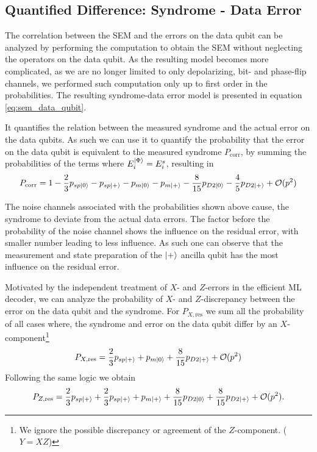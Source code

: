 \subsection{Quantified Difference: Syndrome - Data Error}\label{ssec:sem_difference_data_qubits}

The correlation between the SEM and the errors on the data qubit can be analyzed by performing the computation to obtain the SEM without neglecting the operators on the data qubit. 
As the resulting model becomes more complicated, as we are no longer limited to only depolarizing, bit- and phase-flip channels, we performed such computation only up to first order in the probabilities.
The resulting syndrome-data error model is presented in equation \eqref{eq:sem_data_qubit}.

It quantifies the relation between the measured syndrome and the actual error on the data qubits. 
As such we can use it to quantify the probability that the error on the data qubit is equivalent to the measured syndrome $P_{\mathrm{corr}}$, 
by summing the probabilities of the terms where $E_i^{\ket{\Phi}} = E_i^s$, resulting in 
\begin{equation}
    P_{\mathrm{corr}} = 
    1
    -\frac{2}{3}p_{sp\ket{0}}
    -p_{sp\ket{+}}
    -p_{m\ket{0}}
    -p_{m\ket{+}}
    -\frac{8}{15}p_{D2\ket{0}}
    -\frac{4}{5}p_{D2\ket{+}}  
    + \mathcal{O}(p^2)
\end{equation}

The noise channels associated with the probabilities shown above cause, the syndrome to deviate from the actual data errors.
The factor before the probability of the noise channel shows the influence on the residual error, with smaller number leading to less influence. 
As such one can observe that the measurement and state preparation of the $\ket{+}$ ancilla qubit has the most influence on the residual error. 

Motivated by the independent treatment of $X$- and $Z$-errors in the efficient ML decoder, 
we can analyze the probability of $X$- and $Z$-discrepancy between the error on the data qubit and the syndrome. 
For $P_{X,\mathrm{res}}$ we sum all the probability of all cases where, the syndrome and error on the data qubit differ by an $X$-component\footnote{
    We ignore the possible discrepancy or agreement of the $Z$-component. ($Y=XZ$)
    } 
\begin{equation}
    P_{X,\mathrm{res}} = 
    \frac{2}{3}p_{sp\ket{+}}
    + p_{m\ket{0}}
    + \frac{8}{15}p_{D2\ket{+}}
    + \mathcal{O}(p^2)
\end{equation}
Following the same logic we obtain
\begin{equation}
    P_{Z,\mathrm{res}} = 
    \frac{2}{3}p_{sp\ket{+}}
    +\frac{2}{3}p_{sp\ket{+}}
    +p_{m\ket{+}}
    +\frac{8}{15}p_{D2\ket{0}}
    +\frac{8}{15}p_{D2\ket{+}}  
    + \mathcal{O}(p^2).
\end{equation}

